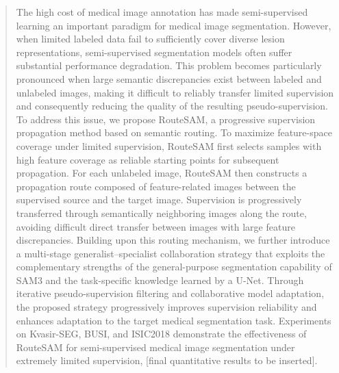 \documentclass[a4paper,fleqn]{cas-dc}
\begin{document}
\fntext[1]{}


\begin{abstract} 
The high cost of medical image annotation has made semi-supervised learning an important paradigm for medical image segmentation. However, when limited labeled data fail to sufficiently cover diverse lesion representations, semi-supervised segmentation models often suffer substantial performance degradation. This problem becomes particularly pronounced when large semantic discrepancies exist between labeled and unlabeled images, making it difficult to reliably transfer limited supervision and consequently reducing the quality of the resulting pseudo-supervision.
To address this issue, we propose RouteSAM, a progressive supervision propagation method based on semantic routing. To maximize feature-space coverage under limited supervision, RouteSAM first selects samples with high feature coverage as reliable starting points for subsequent propagation. For each unlabeled image, RouteSAM then constructs a propagation route composed of feature-related images between the supervised source and the target image. Supervision is progressively transferred through semantically neighboring images along the route, avoiding difficult direct transfer between images with large feature discrepancies.
Building upon this routing mechanism, we further introduce a multi-stage generalist–specialist collaboration strategy that exploits the complementary strengths of the general-purpose segmentation capability of SAM3 and the task-specific knowledge learned by a U-Net. Through iterative pseudo-supervision filtering and collaborative model adaptation, the proposed strategy progressively improves supervision reliability and enhances adaptation to the target medical segmentation task.
Experiments on Kvasir-SEG, BUSI, and ISIC2018 demonstrate the effectiveness of RouteSAM for semi-supervised medical image segmentation under extremely limited supervision, [final quantitative results to be inserted].
\end{abstract}

\end{document}
